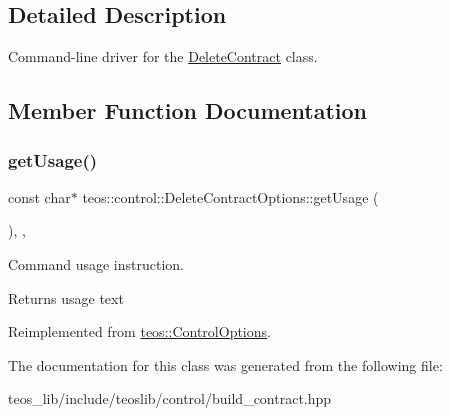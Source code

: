 \subsection{Detailed Description}
Command-\/line driver for the \mbox{\hyperlink{classteos_1_1control_1_1_delete_contract}{Delete\+Contract}} class. 

\subsection{Member Function Documentation}
\mbox{\label{classteos_1_1control_1_1_delete_contract_options_abca9a6e25e4bcaf14b130199f32e4fbf}} 
\subsubsection{\texorpdfstring{get\+Usage()}{getUsage()}}
{\footnotesize\ttfamily const char$\ast$ teos\+::control\+::\+Delete\+Contract\+Options\+::get\+Usage (\begin{DoxyParamCaption}{ }\end{DoxyParamCaption})\hspace{0.3cm}{\ttfamily [inline]}, {\ttfamily [protected]}, {\ttfamily [virtual]}}



Command \textquotesingle{}usage\textquotesingle{} instruction. 

\begin{DoxyReturn}{Returns}
usage text 
\end{DoxyReturn}


Reimplemented from \mbox{\hyperlink{classteos_1_1_control_options_a0aa5671f9bc750ed5280c26c543874f3}{teos\+::\+Control\+Options}}.



The documentation for this class was generated from the following file\+:\begin{DoxyCompactItemize}
\item 
teos\+\_\+lib/include/teoslib/control/build\+\_\+contract.\+hpp\end{DoxyCompactItemize}
